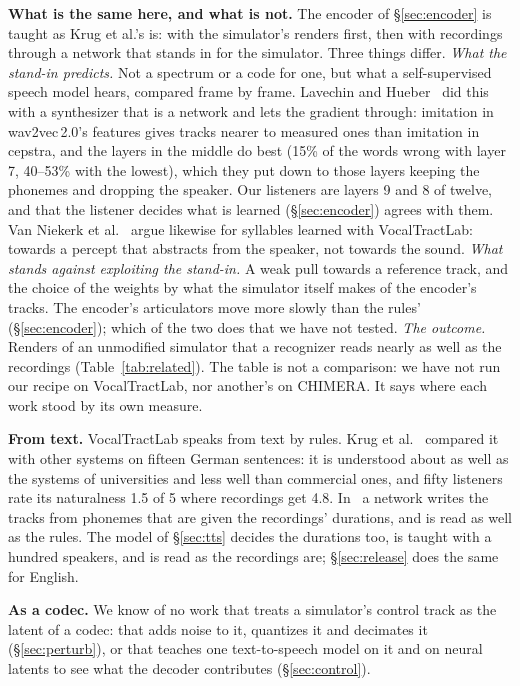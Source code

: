 \documentclass[10pt,a4paper,twocolumn]{article}
\begin{document}
\textbf{What is the same here, and what is not.} The encoder of \S\ref{sec:encoder} is taught
as Krug et al.'s is: with the simulator's renders first, then with recordings through a network
that stands in for the simulator. Three things differ. \emph{What the stand-in predicts.} Not a
spectrum or a code for one, but what a self-supervised speech model hears, compared frame by
frame. Lavechin and Hueber~\cite{lavechin} did this with a synthesizer that is a network and
lets the gradient through: imitation in wav2vec\,2.0's features gives tracks nearer to measured
ones than imitation in cepstra, and the layers in the middle do best (15\% of the words wrong
with layer 7, 40--53\% with the lowest), which they put down to those layers keeping the
phonemes and dropping the speaker. Our listeners are layers 9 and 8 of twelve, and that the
listener decides what is learned (\S\ref{sec:encoder}) agrees with them. Van Niekerk et al.~\cite{beyond} argue
likewise for syllables learned with VocalTractLab: towards a percept that abstracts from the
speaker, not towards the sound. \emph{What stands against exploiting the stand-in.} A weak pull
towards a reference track, and the choice of the weights by what the simulator itself makes of
the encoder's tracks. The encoder's articulators move more slowly than the rules'
(\S\ref{sec:encoder}); which of the two does that we have not tested. \emph{The outcome.}
Renders of an unmodified simulator that a recognizer reads nearly as well as the recordings
(Table~\ref{tab:related}). The table is not a comparison: we have not run our recipe on
VocalTractLab, nor another's on CHIMERA. It says where each work stood by its own measure.

\textbf{From text.} VocalTractLab speaks from text by rules. Krug et al.~\cite{vtltts}
compared it with other systems on fifteen German sentences: it is understood about as well as
the systems of universities and less well than commercial ones, and fifty listeners rate its
naturalness 1.5 of 5 where recordings get 4.8. In~\cite{krug} a network writes the tracks from
phonemes that are given the recordings' durations, and is read as well as the rules. The model
of \S\ref{sec:tts} decides the durations too, is taught with a hundred speakers, and is read as
the recordings are; \S\ref{sec:release} does the same for English.

\textbf{As a codec.} We know of no work that treats a simulator's control track as the latent
of a codec: that adds noise to it, quantizes it and decimates it (\S\ref{sec:perturb}), or that
teaches one text-to-speech model on it and on neural latents to see what the decoder
contributes (\S\ref{sec:control}).
\end{document}
